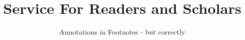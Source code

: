 \documentclass[
  DIV=calc,
  BCOR=5mm,
  11pt,small
  headings,
  oneside,
  abstract=true,
  toc=bib,
  ngerman,english]{scrartcl}
\begin{document}
\nocite{*}

\titlehead{fodina.csr.howto-: the mykeds Classical
Scholar Research framework}
\subject{Classical Scholar Texts With \textit{jurabib}}
\title{Service For Readers and Scholars}
\subtitle{Annotations in Footnotes - but correctly}

\maketitle



\footnotesize
\tableofcontents
\normalsize



\small



\printnomenclature


\end{document}
